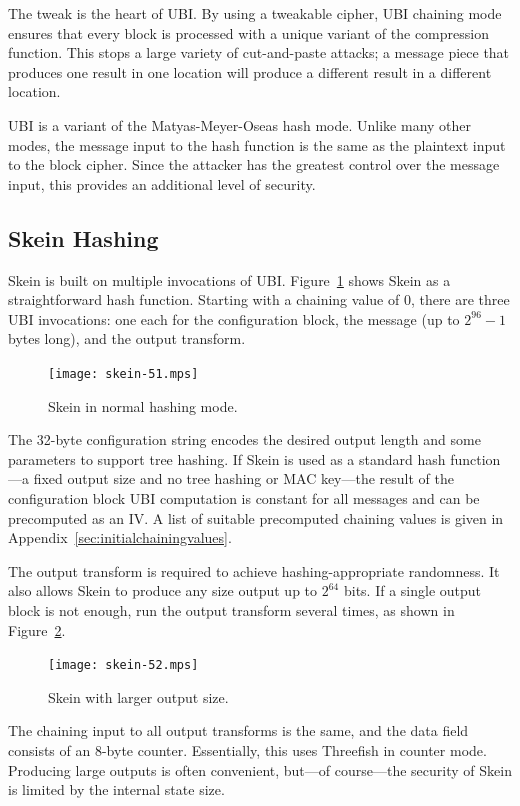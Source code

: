 \documentclass[11pt,twoside]{article}
\begin{document}
The tweak is the heart of UBI.  By using a tweakable cipher, UBI chaining mode ensures that every block is processed with a unique variant of the compression function.  This stops a large variety of cut-and-paste attacks; a message piece that produces one result in one location will produce a different result in a different location.

UBI is a variant of the Matyas-Meyer-Oseas \cite{MMO85} hash mode.  Unlike many other modes, the message input to the hash function is the same as the plaintext input to the block cipher.  Since the attacker has the greatest control over the message input, this provides an additional level of security.

\subsection{Skein Hashing}

Skein is built on multiple invocations of UBI.  Figure~\ref{fig:SkeinSerialHashing} shows Skein as a straightforward hash function.  Starting with a chaining value of 0, there are three UBI invocations: one each for the configuration block, the message (up to $2^{96}-1$ bytes long), and the output transform.
%
\begin{figure}[htbp]
\begin{center}
\texttt{[image: skein-51.mps]}
\end{center}
\caption{Skein in normal hashing mode.} \label{fig:SkeinSerialHashing}
\end{figure}
%

The 32-byte configuration string encodes the desired output length and some parameters to support tree hashing.  If Skein is used as a standard hash function---a fixed output size and no tree hashing or MAC key---the result of the configuration block UBI computation is constant for all messages and can be precomputed as an IV.  A list of suitable precomputed chaining values is given in Appendix~\ref{sec:initialchainingvalues}.

The output transform is required to achieve hashing-appropriate randomness.
It also allows Skein to produce any size output up to $2^{64}$ bits. If a single output block is not enough, run the output transform several times, as shown in Figure~\ref{fig:SkeinLargeOutput}.
%
\begin{figure}[htbp]
\begin{center}
\texttt{[image: skein-52.mps]}
\end{center}
\caption{Skein with larger output size.} \label{fig:SkeinLargeOutput}
\end{figure}
%
The chaining input to all output transforms is the same, and the data field consists of an 8-byte counter.  Essentially, this uses Threefish in counter mode.  Producing large outputs is often convenient, but---of course---the security of Skein is limited by the internal state size.
\end{document}
